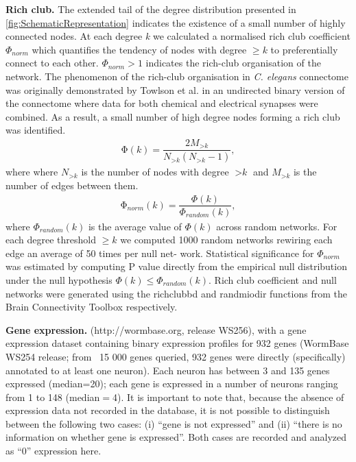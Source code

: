 \documentclass[10pt,letterpaper]{article}
\begin{document}
\textbf{Rich club.} The extended tail of the degree distribution presented in \ref{fig:SchematicRepresentation} indicates the existence of a small number of highly connected nodes. 
At each degree \textit{k} we calculated a normalised rich club coefficient $\Phi_{\textit{norm}}$ which quantifies the tendency of nodes with degree $\geq k$ to preferentially connect to each other. 
$\Phi_{norm}> 1$ indicates the rich-club organisation of the network. 
The phenomenon of the rich-club organisation in \textit{C. elegans} connectome was originally demonstrated by Towlson et al. \cite{Towlson2013} in an undirected binary version of the connectome where data for both chemical and electrical synapses were combined.
As a result, a small number of high degree nodes forming a rich club was identified.   
 	\begin{eqnarray}
	\label{eq:RCcoef}
     \mathrm{\Phi(\textit{k})} = \dfrac{2M_{>\textit{k}}}{N_{>\textit{k}}(N_{>\textit{k}}-1)}, 
	 \end{eqnarray}
where where $N_{>\textit{k}}$ is the number of nodes with degree $>\textit{k}$ and $M_{>\textit{k}}$ is the number of edges between them. 
\begin{eqnarray}
	\label{eq:RCnormcoef}
     \mathrm{\Phi_{\textit{norm}}(\textit{k})} = \dfrac{\Phi(\textit{k})}{\Phi_{\textit{random}}(\textit{k})}, 
	 \end{eqnarray}
where $\Phi_{\textit{random}}(\textit{k})$ is the average value of $\Phi(\textit{k})$ across random networks.
For each degree threshold $\geq k$ we computed 1000 random networks rewiring each edge an average of 50 times per null net- work. Statistical significance for $\Phi_{norm}$ was estimated by computing P value directly from the empirical null
distribution under the null hypothesis $\Phi(\textit{k}) \leq \Phi_{\textit{random}}(\textit{k})$. 
Rich club coefficient and null networks were generated using the rich\textunderscore club\textunderscore bd and randmio\textunderscore dir functions from the Brain Connectivity Toolbox \cite{Rubinov2010} respectively.

\textbf{Gene expression.}
(http://wormbase.org, release WS256),
with a gene expression dataset containing binary expression profiles for 932 genes (WormBase WS254 release; from ~15 000 genes queried, 932 genes were directly (specifically) annotated to at least one neuron).
Each neuron has between 3 and 135 genes expressed (median=20); each gene is expressed in a number of neurons ranging from 1 to 148 (median$=$4).
It is important to note that, because the absence of expression data not recorded in the database, it is not possible to distinguish between the following two cases: (i) ``gene is not expressed'' and (ii) ``there is no information on whether gene is expressed''.
Both cases are recorded and analyzed as ``0'' expression here.\\
\end{document}
